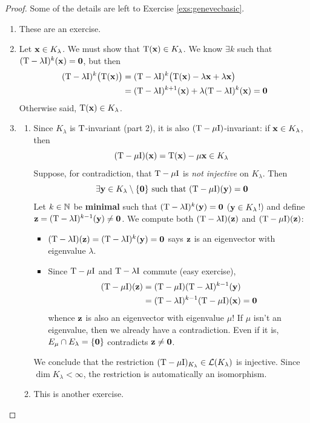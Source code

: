 \begin{proof}
	Some of the details are left to Exercise \ref{exs:genevecbasic}.
	\begin{enumerate}
	  \item These are an exercise.
	  
	  \item Let ${\mathbf{x}}\in K_\lambda$. We must show that $\mathrm{T}({\mathbf{x}})\in K_\lambda$. We know $\exists k$ such that $(\mathrm{T}-\lambda \mathrm{I})^k({\mathbf{x}})=\mathbf{0}$, but then
	  \begin{align*}
		  (\mathrm{T}-\lambda \mathrm{I})^k\bigl(\mathrm{T}({\mathbf{x}})\bigr)&=(\mathrm{T}-\lambda \mathrm{I})^{k}\bigl(\mathrm{T}({\mathbf{x}})-\lambda {\mathbf{x}}+\lambda{\mathbf{x}}\bigr)\\
		  &=(\mathrm{T}-\lambda \mathrm{I})^{k+1}({\mathbf{x}})+\lambda(\mathrm{T}-\lambda \mathrm{I})^k({\mathbf{x}}) =\mathbf{0}
	  \end{align*}
	  Otherwise said, $\mathrm{T}({\mathbf{x}})\in K_\lambda$.
	  
	  \item\begin{enumerate}
	    \item Since $K_\lambda$ is $\mathrm{T}$-invariant (part 2), it is also $(\mathrm{T}-\mu \mathrm{I})$-invariant: if ${\mathbf{x}}\in K_\lambda$, then
	    \[
	    	(\mathrm{T}-\mu\mathrm{I})({\mathbf{x}})=\mathrm{T}({\mathbf{x}})-\mu{\mathbf{x}}\in K_\lambda
	    \]
	    Suppose, for contradiction, that $\mathrm{T}-\mu\mathrm{I}$ is \emph{not injective} on $K_\lambda$. Then
			\[
				\exists{\mathbf{y}}\in K_\lambda\setminus\{\mathbf{0}\}
				\text{ such that }
				(\mathrm{T}-\mu \mathrm{I})({\mathbf{y}})=\mathbf{0}
			\]
			Let $k\in\mathbb{N}$ be \textbf{minimal} such that $(\mathrm{T}-\lambda \mathrm{I})^k({\mathbf{y}})=\mathbf{0}$ (${\mathbf{y}}\in K_\lambda$!) and define ${\mathbf{z}}=(\mathrm{T}-\lambda \mathrm{I})^{k-1}({\mathbf{y}})\neq\mathbf{0}$. We compute both $(\mathrm{T}-\lambda\mathrm{I})({\mathbf{z}})$ and $(\mathrm{T}-\mu\mathrm{I})({\mathbf{z}})$:
			\begin{itemize}
			  \item $(\mathrm{T}-\lambda\mathrm{I})({\mathbf{z}})=(\mathrm{T}-\lambda \mathrm{I})^k({\mathbf{y}})=\mathbf{0}$ says ${\mathbf{z}}$ is an eigenvector with eigenvalue $\lambda$.
				\item Since $\mathrm{T}-\mu\mathrm{I}$ and $\mathrm{T}-\lambda\mathrm{I}$ commute (easy exercise),
				\begin{align*}
					(\mathrm{T}-\mu \mathrm{I})({\mathbf{z}})
					&=(\mathrm{T}-\mu\mathrm{I})(\mathrm{T}-\lambda \mathrm{I})^{k-1}({\mathbf{y}})\\
					&=(\mathrm{T}-\lambda \mathrm{I})^{k-1}(\mathrm{T}-\mu \mathrm{I})({\mathbf{x}})
					=\mathbf{0}
				\end{align*}
				whence ${\mathbf{z}}$ is also an eigenvector with eigenvalue $\mu$! If $\mu$ isn't an eigenvalue, then we already have a contradiction. Even if it is, $E_\mu\cap E_\lambda=\{\mathbf{0}\}$ contradicts ${\mathbf{z}}\neq\mathbf{0}$.
			\end{itemize}
			\smallbreak
			We conclude that the restriction $(\mathrm{T}-\mu\mathrm{I})_{K_\lambda}\in\mathcal{L}(K_\lambda)$ is injective. Since $\dim K_\lambda<\infty$, the restriction is automatically an isomorphism.
			\item	This is another exercise.\qedhere
	  \end{enumerate} 
	\end{enumerate}
\end{proof}


